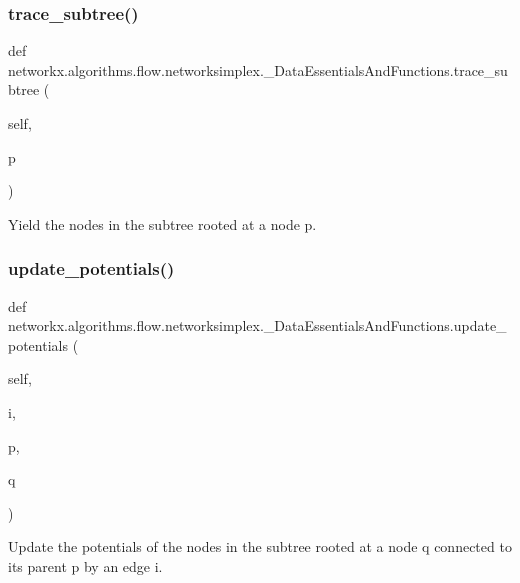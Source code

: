 \subsubsection{\texorpdfstring{trace\+\_\+subtree()}{trace\_subtree()}}
{\footnotesize\ttfamily def networkx.\+algorithms.\+flow.\+networksimplex.\+\_\+\+Data\+Essentials\+And\+Functions.\+trace\+\_\+subtree (\begin{DoxyParamCaption}\item[{}]{self,  }\item[{}]{p }\end{DoxyParamCaption})}

\begin{DoxyVerb}Yield the nodes in the subtree rooted at a node p.
\end{DoxyVerb}
 \mbox{\label{classnetworkx_1_1algorithms_1_1flow_1_1networksimplex_1_1__DataEssentialsAndFunctions_a2f2c4432bd4b3d8f7e980ec2dec60e87}} 
\subsubsection{\texorpdfstring{update\+\_\+potentials()}{update\_potentials()}}
{\footnotesize\ttfamily def networkx.\+algorithms.\+flow.\+networksimplex.\+\_\+\+Data\+Essentials\+And\+Functions.\+update\+\_\+potentials (\begin{DoxyParamCaption}\item[{}]{self,  }\item[{}]{i,  }\item[{}]{p,  }\item[{}]{q }\end{DoxyParamCaption})}

\begin{DoxyVerb}Update the potentials of the nodes in the subtree rooted at a node
q connected to its parent p by an edge i.
\end{DoxyVerb}
 

